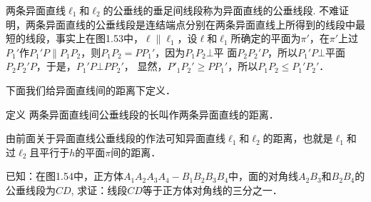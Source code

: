   两条异面直线$\ell_1$和$\ell_2$的公垂线的垂足间线段称为异面直线的公垂线段. 不难证明，两条异面直线的公垂线段是连结端点分别在两条异面直线上所得到的线段中最短的线段，事实上在图1.53中，$\ell\parallel \ell_1$，设$\ell$和$\ell_1$所确定的平面为$\pi'$，在$\pi'$上过$P_1'$作$P_1'P\parallel P_1P_2$，则$P_1P_2=PP_1'$，因为$P_1P_2\bot $平
  面$P_2P_2'P$，所以$P_1'P\bot $平面$P_2P_2'P$，于是，$P_1'P\bot PP_2'$，
  显然，$P'_1P_2'\ge PP_1'$，所以$P_1P_2\le P_1'P_2'$．
  
    
  

下面我们给异面直线间的距离下定义．

\begin{blk}
  {定义} 两条异面直线间公垂线段的长叫作两条异面直线的距离．
\end{blk}


由前面关于异面直线公垂线段的作法可知异面直线$\ell_1$和$\ell_2$的距离，也就是$\ell_1$和过$\ell_2$且平行于$h$的平面$\pi$间的距离．

\begin{example}
  已知：在图1.54中，正方体$A_1A_2A_3A_4-B_1B_2B_3B_4$中，面的对角线$A_2B_3$和$B_2B_4$的公垂线段为$CD$, 求证：线段$CD$等于正方体对角线的三分之一．
\end{example}

\begin{figure}[htp]
  \centering
{}
  \caption{}
\end{figure}


